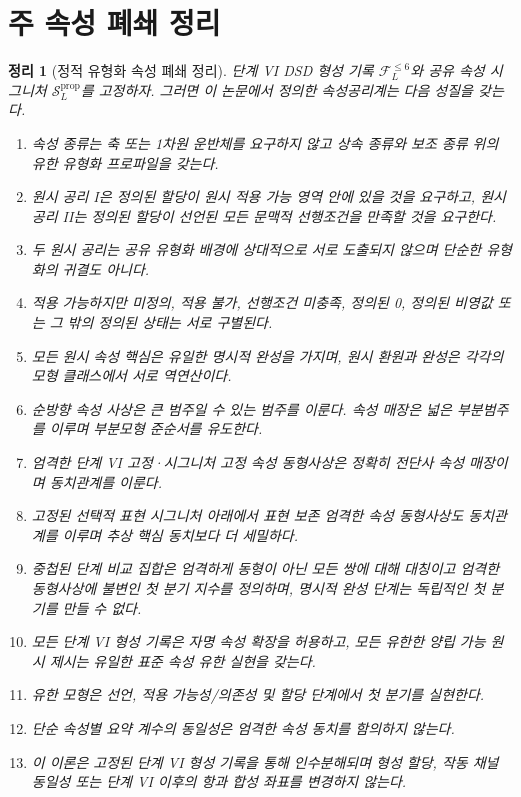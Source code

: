 \documentclass[11pt]{article}
\newcommand{\FVI}{\mathcal F_{L}^{\le 6}}
\newcommand{\Sprop}{\mathcal S_{L}^{\mathrm{prop}}}
\newtheorem{theorem}{정리}[section]
\theoremstyle{definition}
\theoremstyle{remark}
\begin{document}
\section{주 속성 폐쇄 정리}
\label{sec:main-theorem}

\begin{theorem}[정적 유형화 속성 폐쇄 정리]
\label{thm:main}
단계 VI DSD 형성 기록 \(\FVI\)와 공유 속성 시그니처 \(\Sprop\)를 고정하자.
그러면 이 논문에서 정의한 속성공리계는 다음 성질을 갖는다.
\begin{enumerate}[label=(\arabic*)]
\item 속성 종류는 축 또는 1차원 운반체를 요구하지 않고 상속 종류와 보조 종류 위의 유한 유형화 프로파일을 갖는다.
\item 원시 공리 I은 정의된 할당이 원시 적용 가능 영역 안에 있을 것을 요구하고, 원시 공리 II는 정의된 할당이 선언된 모든 문맥적 선행조건을 만족할 것을 요구한다.
\item 두 원시 공리는 공유 유형화 배경에 상대적으로 서로 도출되지 않으며 단순한 유형화의 귀결도 아니다.
\item 적용 가능하지만 미정의, 적용 불가, 선행조건 미충족, 정의된 0, 정의된 비영값 또는 그 밖의 정의된 상태는 서로 구별된다.
\item 모든 원시 속성 핵심은 유일한 명시적 완성을 가지며, 원시 환원과 완성은 각각의 모형 클래스에서 서로 역연산이다.
\item 순방향 속성 사상은 큰 범주일 수 있는 범주를 이룬다. 속성 매장은 넓은 부분범주를 이루며 부분모형 준순서를 유도한다.
\item 엄격한 단계 VI 고정·시그니처 고정 속성 동형사상은 정확히 전단사 속성 매장이며 동치관계를 이룬다.
\item 고정된 선택적 표현 시그니처 아래에서 표현 보존 엄격한 속성 동형사상도 동치관계를 이루며 추상 핵심 동치보다 더 세밀하다.
\item 중첩된 단계 비교 집합은 엄격하게 동형이 아닌 모든 쌍에 대해 대칭이고 엄격한 동형사상에 불변인 첫 분기 지수를 정의하며, 명시적 완성 단계는 독립적인 첫 분기를 만들 수 없다.
\item 모든 단계 VI 형성 기록은 자명 속성 확장을 허용하고, 모든 유한한 양립 가능 원시 제시는 유일한 표준 속성 유한 실현을 갖는다.
\item 유한 모형은 선언, 적용 가능성/의존성 및 할당 단계에서 첫 분기를 실현한다.
\item 단순 속성별 요약 계수의 동일성은 엄격한 속성 동치를 함의하지 않는다.
\item 이 이론은 고정된 단계 VI 형성 기록을 통해 인수분해되며 형성 할당, 작동 채널 동일성 또는 단계 VI 이후의 항과 합성 좌표를 변경하지 않는다.
\end{enumerate}
\end{theorem}
\end{document}

